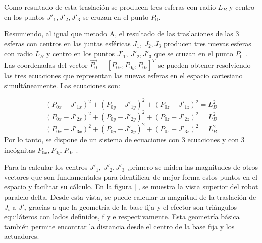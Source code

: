         Como resultado de esta traslación se producen tres esferas con radio $L_B$ y centro en los puntos $J'_1,J'_2,J'_3$  se cruzan en el punto $P_0$.




    \newpage


        
    Resumiendo, al igual que metodo A, el resultado de las traslaciones de las 3 esferas con centros en las juntas esféricas  \( J_{1},~J_{2},J_{3} \)  producen tres nuevas esferas con radio  \( L_{B} \)  y centro en los puntos  \( J'_{1},~J'_{2},J'_{3} \)   que se cruzan en el punto  \( P_{0} \) . Las coordenadas del vector  \( \overrightarrow{P_{0}}=  \left[ P_{0x},P_{0y},P_{0z} \right] ^{T} \)  se pueden obtener resolviendo las tres ecuaciones que representan las nuevas esferas en el espacio cartesiano simultáneamente. Las ecuaciones son:
    
        \begin{equation}
            \left( P_{0x}-J'_{1x} \right) ^{2}+ \left( P_{0y}-J'_{1y} \right) ^{2}+ \left( P_{0z}-J'_{1z} \right) ^{2}=L_{B}^{2}
        \label{eq:cap4_MB_21}
        \end{equation}
        \begin{equation}
            \left( P_{0x}-J'_{2x} \right) ^{2}+ \left( P_{0y}-J'_{2y} \right) ^{2}+ \left( P_{0z}-J'_{2z} \right) ^{2}=L_{B}^{2}
        \label{eq:cap4_MB_22}
        \end{equation}    
        \begin{equation}
            \left( P_{0x}-J'_{3x} \right) ^{2}+ \left( P_{0y}-J'_{3y} \right) ^{2}+ \left( P_{0z}-J'_{3z} \right) ^{2}=L_{B}^{2}
        \label{eq:cap4_MB_23}
        \end{equation}            
    Por lo tanto, se dispone de un sistema de ecuaciones con 3 ecuaciones y con 3 incógnitas \( P_{0x},P_{0y},P_{0z} \) .  
    
    Para la calcular los centros \( J'_{1},~J'_{2},J'_{3} \) ,primero se miden las magnitudes de otros vectores que son fundamentales para identificar de mejor forma estos puntos en el espacio y facilitar su cálculo. En la figura \ref{}, se muestra la vista superior del robot paralelo delta. Desde esta vista, se puede calcular la magnitud de la traslación de  $J_i$ a  $J'_i$  gracias a que la geometría de la base fija y el efector son triángulos equiláteros con lados definidos, f y e respectivamente. Esta geometría básica también permite encontrar la distancia desde el centro de la base fija y los actuadores.
    
